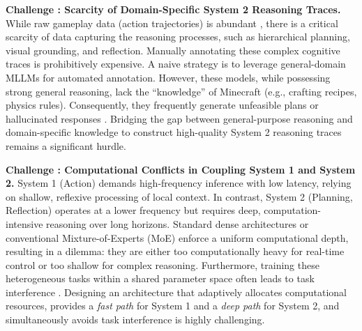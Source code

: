 

\textbf{Challenge \uppercase\expandafter{}: Scarcity of Domain-Specific System 2 Reasoning Traces.}  While raw gameplay data (action trajectories) is abundant \cite{vpt,lifshitz2024steve}, there is a critical scarcity of data capturing the reasoning processes, such as hierarchical planning, visual grounding, and reflection. Manually annotating these complex cognitive traces is prohibitively expensive. A naive strategy is to leverage general-domain MLLMs \cite{liu2024visual,chen2024lion,bai2025qwen2} for automated annotation. However, these models, while possessing strong general reasoning, lack the ``knowledge'' of Minecraft (e.g., crafting recipes, physics rules). Consequently, they frequently generate unfeasible plans or hallucinated responses \cite{bai2025qwen2,lu2024deepseek}. Bridging the gap between general-purpose reasoning and domain-specific knowledge to construct high-quality System 2 reasoning traces remains a significant hurdle.



\textbf{Challenge \uppercase\expandafter{}: Computational Conflicts in Coupling System 1 and System 2.}  System 1 (Action) demands high-frequency inference with low latency, relying on shallow, reflexive processing of local context. In contrast, System 2 (Planning, Reflection) operates at a lower frequency but requires deep, computation-intensive reasoning over long horizons. Standard dense architectures or conventional Mixture-of-Experts (MoE) \cite{moesurvey,huang2025modes}  enforce a uniform computational depth, resulting in a dilemma: they are either too computationally heavy for real-time control or too shallow for complex reasoning. Furthermore, training these heterogeneous tasks within a shared parameter space often leads to task interference \cite{shen2025mome,dai2401deepseekmoe}. Designing an architecture that adaptively allocates computational resources, provides a \emph{fast path} for System 1 and a \emph{deep path} for System 2, and simultaneously avoids task interference is highly challenging.



